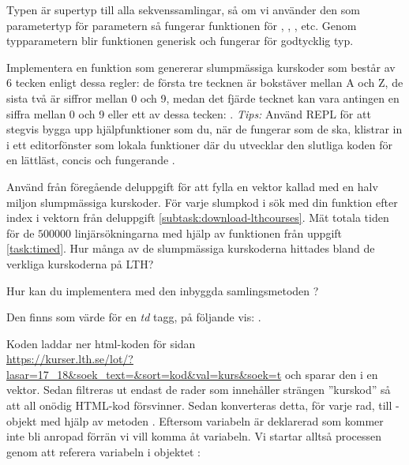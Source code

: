 Typen  är supertyp till alla sekvenssamlingar, så om vi använder den som parametertyp för parametern  så fungerar funktionen för , , , etc. Genom typparametern  blir funktionen generisk och fungerar för godtycklig typ.



\Subtask \label{subtask:linsearch-rndCode} Implementera en funktion  som genererar slumpmässiga kurskoder som består av 6 tecken enligt dessa regler: de första tre tecknen är bokstäver mellan A och Z, de sista två är siffror mellan 0 och 9, medan det fjärde tecknet kan vara antingen en siffra mellan 0 och 9 eller ett av dessa tecken: . \emph{Tips:} Använd REPL  för att stegvis bygga upp hjälpfunktioner som du, när de fungerar som de ska, klistrar in i ett editorfönster som lokala funktioner där du utvecklar den slutliga koden för en lättläst, concis och fungerande .


\Subtask Använd  från föregående deluppgift för att fylla en vektor kallad  med en halv miljon slumpmässiga kurskoder. För varje slumpkod i  sök med din funktion  efter index i vektorn  från deluppgift \ref{subtask:download-lthcourses}. Mät totala tiden för de $500000$ linjärsökningarna med hjälp av funktionen  från uppgift \ref{task:timed}. Hur många av de slumpmässiga kurskoderna hittades bland de verkliga kurskoderna på LTH?



\Subtask\Pen Hur kan du implementera  med den inbyggda samlingsmetoden ?



\SOLUTION


\TaskSolved \what


\SubtaskSolved
Den finns som värde för en \emph{td} tagg, på följande vis: .

\SubtaskSolved
Koden laddar ner html-koden för sidan \\ \mbox{\small\url{https://kurser.lth.se/lot/?lasar=17_18&soek_text=&sort=kod&val=kurs&soek=t}} och sparar den i en vektor. Sedan filtreras ut endast de rader som innehåller strängen ”kurskod” så att all onödig HTML-kod försvinner. Sedan konverteras detta, för varje rad, till -objekt med hjälp av metoden . Eftersom variabeln  är deklarerad som  kommer inte  bli anropad förrän vi vill komma åt variabeln. Vi startar alltså processen genom att referera variabeln  i objektet :

